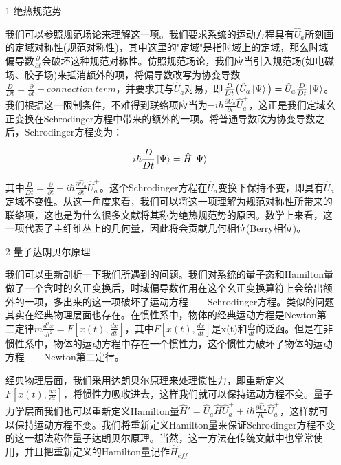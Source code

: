 \documentclass[a4paper]{article}
\begin{document}
        \begin{itemize}
        \item[1] 绝热规范势 
            
            我们可以参照规范场论来理解这一项。我们要求系统的运动方程具有$\hat{U}_a$所刻画的定域对称性(规范对称性)，其中这里的"定域"是指时域上的定域，那么时域偏导数$\frac{\partial}{\partial t}$会破坏这种规范对称性。仿照规范场论，我们应当引入规范场(如电磁场、胶子场)来抵消额外的项，将偏导数改写为协变导数$\frac{D}{Dt}=\frac{\partial}{\partial t}+connection\ term$，并要求其与$\hat{U}_a$对易，即$\frac{D}{Dt}\big(\hat{U}_a\ket{\Psi}\big)=\hat{U}_a\frac{D}{Dt}\ket{\Psi}$。我们根据这一限制条件，不难得到联络项应当为$-i\hbar\frac{\partial\hat{U}_a}{\partial t}\hat{U}_a^+$，这正是我们定域幺正变换在Schrodinger方程中带来的额外的一项。将普通导数改为协变导数之后，Schrodinger方程变为：

            \begin{equation}
                i\hbar\frac{D}{Dt}\ket{\Psi} = \hat{H}\ket{\Psi}
            \end{equation}

            其中$\frac{D}{Dt}=\frac{\partial}{\partial t}-i\hbar\frac{\partial\hat{U}_a}{\partial t}\hat{U}_a^+$。这个Schrodinger方程在$\hat{U}_a$变换下保持不变，即具有$\hat{U}_a$定域不变性。从这一角度来看，我们可以将这一项理解为规范对称性所带来的联络项，这也是为什么很多文献将其称为绝热规范势的原因。数学上来看，这一项代表了主纤维丛上的几何量，因此将会贡献几何相位(Berry相位)。
        
        \item[2] 量子达朗贝尔原理
            
            我们可以重新剖析一下我们所遇到的问题。我们对系统的量子态和Hamilton量做了一个含时的幺正变换后，时域偏导数作用在这个幺正变换算符上会给出额外的一项，多出来的这一项破坏了运动方程——Schrodinger方程。类似的问题其实在经典物理层面也存在。在惯性系中，物体的经典运动方程是Newton第二定律$m\frac{d^2x}{dt^2}=F[x(t),\frac{dx}{dt}]$，其中$F[x(t),\frac{dx}{dt}]$是x(t)和$\frac{dx}{dt}$的泛函。但是在非惯性系中，物体的运动方程中存在一个惯性力，这个惯性力破坏了物体的运动方程——Newton第二定律。

            经典物理层面，我们采用达朗贝尔原理来处理惯性力，即重新定义$F[x(t),\frac{dx}{dt}]$，将惯性力吸收进去，这样我们就可以保持运动方程不变。量子力学层面我们也可以重新定义Hamilton量$\hat{H}'=\hat{U}_a\hat{H}\hat{U}_a^+ + i\hbar\frac{\partial\hat{U}_a}{\partial t}\hat{U}_a^+$，这样就可以保持运动方程不变。我们将重新定义Hamilton量来保证Schrodinger方程不变的这一想法称作量子达朗贝尔原理。当然，这一方法在传统文献中也常常使用，并且把重新定义的Hamilton量记作$\hat{H}_{eff}$
            
        \end{itemize}
\end{document}
